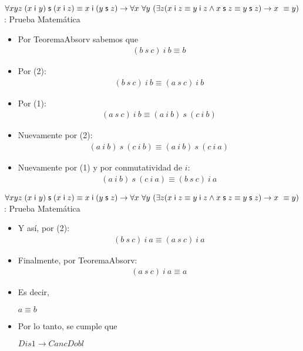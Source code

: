 \documentclass[10pt]{beamer}
\newcommand{\Cfonti}{\fontsize{8.5}{7.2}\selectfont}
\newcommand{\acot}{Dis1\rightarrow CancDobl}
\newcommand{\idistr}{\forall xyz\;(x\;\mathsf{i}\
y)\;\mathsf{s}\;(x\;\mathsf{i}\;z)\equiv x\;\mathsf{i}\;(y\;\mathsf{s}%
\;z)}
\newcommand{\myconj}{x\;\mathsf{i}\;z\equiv y\;\mathsf{%
i}\;z\wedge x\;\mathsf{s}\;z\equiv y\;\mathsf{s}\;z}
\begin{document}
\begin{frame}{\Cfonti$\idistr \rightarrow \forall x\ \forall y\ (\exists z (\myconj) \rightarrow x\ \equiv y)$:
   Prueba Matemática}
  \begin{itemize}[<+->]

    \item Por TeoremaAbsorv sabemos que
      \begin{align}
        (b\ s\ c)\ i\ b \equiv b
      \end{align}
    \item Por (2):
      \begin{align}
        (b\ s\ c)\ i\ b \equiv (a\ s\ c)\ i\ b
      \end{align}
    \item Por (1):
      \begin{align}
        (a\ s\ c)\ i\ b \equiv (a\ i\ b)\ s\ (c\ i\ b)
      \end{align}
    \item Nuevamente por (2):
      \begin{align}
        (a\ i\ b)\ s\ (c\ i\ b) \equiv (a\ i\ b)\ s\ (c\ i\ a)
      \end{align}

    \item Nuevamente por (1) y por conmutatividad de $i$:
      \begin{align}
        (a\ i\ b)\ s\ (c\ i\ a) \equiv (b\ s\ c)\ i\ a
      \end{align}


  \end{itemize}
\end{frame}


\begin{frame}{\Cfonti$\idistr \rightarrow \forall x\ \forall y\ (\exists z (\myconj) \rightarrow x\ \equiv y)$:
   Prueba Matemática}
  \begin{itemize}[<+->]
    \item Y así, por (2):
      \begin{align}
        (b\ s\ c)\ i\ a \equiv (a\ s\ c)\ i\ a
      \end{align}

    \item Finalmente, por TeoremaAbsorv:
      \begin{align}
        (a\ s\ c)\ i\ a \equiv a
      \end{align}
    \item Es decir,
      \begin{center}
        $a \equiv b$
      \end{center}

    \item Por lo tanto, se cumple que
      \begin{center}
        $\acot$
      \end{center}

  \end{itemize}
\end{frame}
\end{document}
